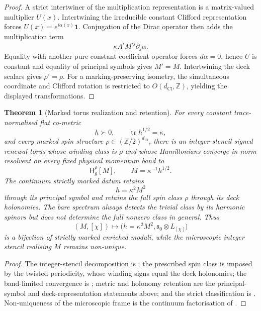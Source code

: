 \documentclass[11pt]{article}
\newtheorem{theorem}{Theorem}[section]
\theoremstyle{definition}
\theoremstyle{remark}
\newcommand{\Z}{\mathbb{Z}}
\newcommand{\Ztwo}{\mathbb{Z}/2}
\newcommand{\dCl}{d_{\mathrm{Cl}}}
\newcommand{\tr}{\operatorname{tr}}
\newcommand{\one}{\mathbf{1}}
\newcommand{\Ham}{\mathsf{H}}
\begin{document}
\begin{proof}
A strict intertwiner of the multiplication representation is a matrix-valued
multiplier \(U(x)\).  Intertwining the irreducible constant Clifford
representation forces \(U(x)=e^{i\alpha(x)}\one\).  Conjugation of the Dirac
operator then adds the multiplication term
\[
  \kappa A^iM^{ij}\partial_j\alpha.
\]
Equality with another pure constant-coefficient operator forces
\(d\alpha=0\), hence \(U\) is constant and equality of principal symbols gives
\(M'=M\).  Intertwining the deck scalars gives \(\rho'=\rho\).
For a marking-preserving isometry, the simultaneous coordinate and Clifford
rotation is restricted to \(O(\dCl,\Z)\), yielding the displayed transformations.
\end{proof}

\begin{theorem}[Marked torus realization and retention]
\label{thm:marked-torus-correspondence}
For every constant trace-normalised flat co-metric
\[
  h\succ0,\qquad \tr h^{1/2}=\kappa,
\]
and every marked spin structure \(\rho\in(\Ztwo)^{\dCl}\), there is an
integer-stencil signed renewal torus whose winding class is \(\rho\) and whose
Hamiltonians converge in norm resolvent on every fixed physical momentum band
to
\[
  \Ham^\rho_g[M],
  \qquad M=\kappa^{-1}h^{1/2}.
\]
The continuum strictly marked datum retains
\[
  h=\kappa^2M^2
\]
through its principal symbol and retains the full spin class \(\rho\) through
its deck holonomies.  The bare spectrum always detects the trivial class by its
harmonic spinors but does not determine the full nonzero class in general.
Thus
\[
  (M,[\chi])
  \longmapsto
  \bigl(h=\kappa^2M^2,\mathfrak s_0\otimes L_{[\chi]}\bigr)
\]
is a bijection of strictly marked enriched moduli, while the microscopic
integer stencil realising \(M\) remains non-unique.
\end{theorem}

\begin{proof}
The integer-stencil decomposition is
; the prescribed spin class is imposed by
the twisted periodicity, whose winding signs equal the deck holonomies; the
band-limited convergence is ; metric and
holonomy retention are the principal-symbol and deck-representation statements
above; and the strict classification is
.  Non-uniqueness of the microscopic frame
is the continuum factorisation of .
\end{proof}
\end{document}
